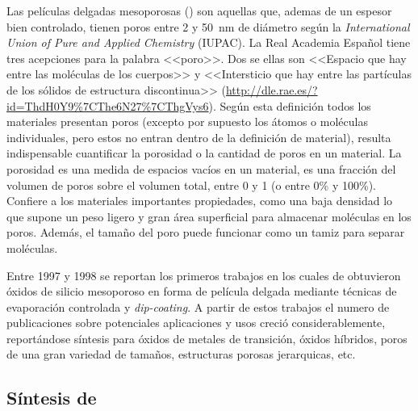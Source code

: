 	Las películas delgadas mesoporosas (\pdm) son aquellas que, ademas de un espesor bien controlado, tienen poros entre 2 y \SI{50}{\nm} de diámetro según la  \textit{International Union of Pure and Applied Chemistry} (IUPAC)\cite{iupac-1994}. La Real Academia Español tiene tres acepciones para la palabra <<poro>>. Dos se ellas son <<Espacio que hay entre las moléculas de los cuerpos>> y <<Intersticio que hay entre las partículas de los sólidos de estructura discontinua>> (\url{http://dle.rae.es/?id=ThdH0Y9%7CThe6N27%7CThgVys6}). Según esta definición todos los materiales presentan poros (excepto por supuesto los átomos o moléculas individuales, pero estos no entran dentro de la definición de material), resulta indispensable cuantificar la porosidad o la cantidad de poros en un material. La porosidad es una medida de espacios vacíos en un material, es una fracción del volumen de poros sobre el volumen total, entre 0 y 1 (o entre 0\% y 100\%).\cite{iupac-1994} Confiere a los materiales importantes propiedades, como una baja densidad lo que supone un peso ligero y gran área superficial para almacenar moléculas en los poros. Además, el tamaño del poro puede funcionar como un tamiz para separar moléculas.\cite{Martin2004} 


	Entre 1997 y 1998 se reportan los primeros trabajos en los cuales de obtuvieron óxidos de silicio mesoporoso en forma de película delgada mediante técnicas de evaporación controlada y \textit{dip-coating}.\cite{Lu1997,Zhao1998a,Zhao1998,Brinker1999} A partir de estos trabajos el numero de publicaciones sobre potenciales aplicaciones y usos creció considerablemente, reportándose síntesis para óxidos de metales de transición\cite{Ciesla1996,Ulagappan1996,Antonelli1995}, óxidos híbridos, poros de una gran variedad de tamaños, estructuras porosas jerarquicas, etc.\cite{Soler-Illia2006,Moller1998}

	\subsection{Síntesis de \pdm}


